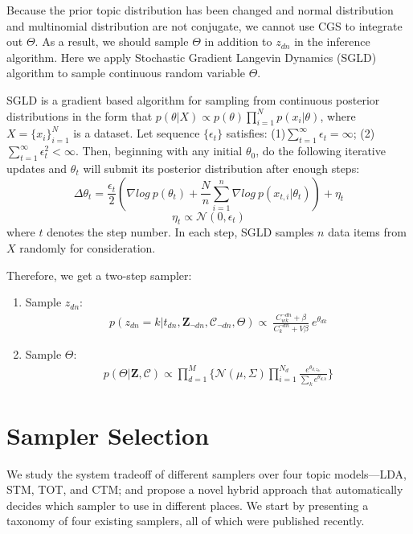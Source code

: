 \documentclass[10pt,journal,cspaper,compsoc]{IEEEtran}
\begin{document}
Because the prior topic distribution has been changed and normal distribution and multinomial distribution are not conjugate, we cannot use
CGS to integrate out $\Theta$. As a result, we 
should sample $\Theta$ in addition to $z_{dn}$ in the inference algorithm. Here we apply Stochastic Gradient Langevin Dynamics (SGLD) algorithm to sample continuous random variable $\Theta$.

SGLD is a  gradient based algorithm for sampling from continuous posterior distributions in the form that 
$p(\theta|X) \propto p(\theta)\prod_{i=1}^Np(x_i|\theta)$, 
where $X=\{x_i\}_{i=1}^N$ is a dataset. 
Let sequence $\{\epsilon_t\}$ satisfies: (1)$\sum_{t=1}^{\infty}\epsilon_t=\infty$; (2)$\sum_{t=1}^{\infty}\epsilon_t^2<\infty$. Then, beginning with any initial $\theta_0$, do the following iterative updates and $\theta_t$ will submit its posterior distribution after enough steps:
$$
\Delta \theta_t=\frac{\epsilon_t}{2}(\nabla log~p(\theta_t)+\frac{N}{n}\sum_{i=1}^{n}{\nabla log~p(x_{t,i}|\theta_t)})+\eta_t
$$
$$
\eta_t \propto \mathcal{N}(0,\epsilon_t)
$$
where $t$ denotes the step number. In each step, SGLD samples $n$ data items from $X$ randomly for consideration.

Therefore, we get a two-step sampler:
\begin{enumerate}
    \item Sample $z_{dn}$:
    \begin{align*}
    \label{eq:ctm_sampling_z}
    p(z_{dn} = k| t_{dn}, \mathbf{Z}_{\neg dn}, \mathcal{C}_{\neg dn}, \Theta) \propto\
    \frac{C_{wk}^{\neg dn} + \beta}{C_{k}^{\neg dn} + V\beta}~e^{\theta_{dk}}
    \end{align*}
    \item Sample $\Theta$:
    \begin{align*}
    \label{eq:ctm_sampling_theta}
    p(\Theta|\mathbf{Z},\mathcal{C}) \propto
    \prod_{d=1}^{M}{\{\mathcal{N}(\mu, \Sigma)\prod_{i=1}^{N_d}{\frac{e^{\theta_{d,z_{di}}}}{\sum_{k}{e^{\theta_{d,k}}}}}\}}
    \end{align*}
\end{enumerate}

\section{Sampler Selection}
	
	We study the system tradeoff of different
	samplers over four topic models---LDA, STM, TOT, and CTM; and propose a novel hybrid
	approach that automatically decides
	which sampler to use in different places.
	We start by presenting a taxonomy of
	four existing samplers, all of which
	were published recently.
	
\end{document}
